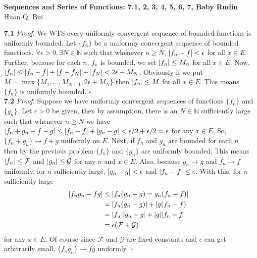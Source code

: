 \documentclass[11pt]{article}
\begin{document}
\begin{center}
{\Large\bf  Sequences and Series of Functions:  7.1, 2, 3, 4, 5, 6, 7, Baby Rudin}\\
$\,$\\
{\Large  Huan Q. Bui}
\end{center}


\noindent \textbf{7.1}
\noindent \textit{Proof.} We WTS every uniformly convergent sequence of bounded functions is uniformly bounded. Let $\{f_n\}$ be a uniformly convergent sequence of bounded functions. $\forall \epsilon > 0, \exists N \in \mathbb{N} $ such that whenever $n \geq N$, $\abs{f_n - f} < \epsilon$ for all $ x \in E$. Further, because for each $n$, $f_n$ is bounded, we set $\abs{f_n} \leq M_n$ for all $x\in E$. Now, $\abs{f_n} \leq \abs{f_n - f} + \abs{f - f_N} + \abs{f_N} < 2\epsilon+ M_N  $. Obviously if we put $M = \max\{ M_1,\dots,M_{N-1}, 2\epsilon + M_{N} \}$ then $\abs{f_n} \leq M$ for all $x\in E$. This means $\{ f_n\}$ is uniformly bounded. \hfill $\square$\\ 



\noindent \textbf{7.2} 
\noindent \textit{Proof.} Suppose we have uniformly convergent sequences of functions $\{ f_n\}$ and $\{ g_n\}$. Let $\epsilon > 0$ be given, then by assumption, there is an $N \in \mathbb{N}$ sufficiently large such that whenever $n \geq N$ we have $\abs{f_n + g_n - f - g} \leq \abs{f_n - f} + \abs{g_n - g} < \epsilon/2 + \epsilon/2 = \epsilon$ for any $x\in E$. So, $\{ f_n + g_n\} \to f+g$ uniformly on $E$. Next, if $f_n$ and $g_n$ are bounded for each $n$ then by the previous problem $\{ f_n\}$ and $\{ g_n\}$ are uniformly bounded. This means $\abs{f_n} \leq \mathcal{F}$ and $\abs{g_n} \leq \mathcal{G}$ for any $n$ and $x \in E$. Also, because $g_n \to g$ and $f_n \to f$ uniformly, for $n$ sufficiently large, $\abs{g_n - g} < \epsilon$ and $\abs{f_n - f} \leq  \epsilon $. With this, for $n$ sufficiently large
\begin{align*}
\abs{f_ng_n - fg} 
&\leq \abs{f_n(g_n - g) = g_n(f_n - f)} \nonumber\\
&= \abs{f_n(g_n - g)} + \abs{g(f_n - f)}\nonumber\\
&= \abs{f_n}\abs{g_n - g} + \abs{g}\abs{f_n - f}\nonumber\\
&= \epsilon(\mathcal{F} + \mathcal{G})
\end{align*}
for any $x\in E$. Of course since $\mathcal{F}$ and $\mathcal{G}$ are fixed constants and $\epsilon$ can get arbitrarily small, $\{f_ng_n\} \to fg$ uniformly. \hfill $\square$\\
\end{document}
